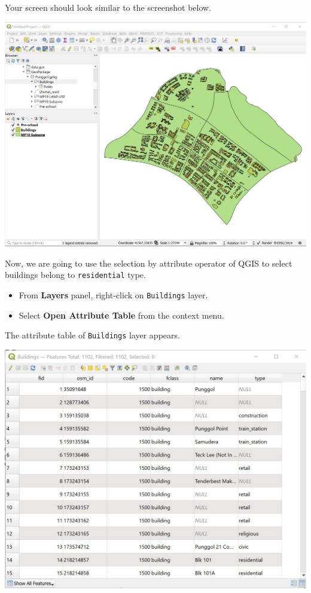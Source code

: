 \documentclass[
  letterpaper,
  DIV=11,
  numbers=noendperiod]{scrreprt}
\providecommand{\tightlist}{%
  \setlength{\itemsep}{0pt}\setlength{\parskip}{0pt}}\usepackage{longtable,booktabs,array}
\begin{document}
Your screen should look similar to the screenshot below.

\includegraphics{./img04/image99.jpg}

Now, we are going to use the selection by attribute operator of QGIS to
select buildings belong to \texttt{residential} type.

\begin{itemize}
\tightlist
\item
  From \textbf{Layers} panel, right-click on \texttt{Buildings} layer.
\item
  Select \textbf{Open Attribute Table} from the context menu.
\end{itemize}

The attribute table of \texttt{Buildings} layer appears.

\includegraphics{./img04/image100.jpg}
\end{document}
